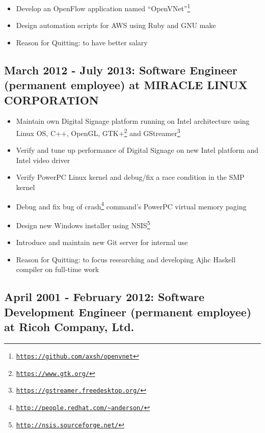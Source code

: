 \documentclass[letterpaper]{article}
\begin{document}
\begin{itemize}
  \item Develop an OpenFlow application named ``OpenVNet''\footnote{\href{https://github.com/axsh/openvnet}{\tt https://github.com/axsh/openvnet}}
  \item Design automation scripts for AWS using Ruby and GNU make
  \item Reason for Quitting: to have better salary
\end{itemize}

\subsection*{March 2012 - July 2013: Software Engineer (permanent employee) at MIRACLE LINUX CORPORATION}

\begin{itemize}
  \item Maintain own Digital Signage platform running on Intel architecture using Linux OS, C++, OpenGL, GTK+\footnote{\href{https://www.gtk.org/}{\tt https://www.gtk.org/}} and GStreamer\footnote{\href{https://gstreamer.freedesktop.org/}{\tt https://gstreamer.freedesktop.org/}}
  \item Verify and tune up performance of Digital Signage on new Intel platform and Intel video driver
  \item Verify PowerPC Linux kernel and debug/fix a race condition in the SMP kernel
  \item Debug and fix bug of crash\footnote{\href{http://people.redhat.com/{\textasciitilde}anderson/}{\tt http://people.redhat.com/{\textasciitilde}anderson/}} command's PowerPC virtual memory paging
  \item Design new Windows installer using NSIS\footnote{\href{http://nsis.sourceforge.net/}{\tt http://nsis.sourceforge.net/}}
  \item Introduce and maintain new Git server for internal use
  \item Reason for Quitting: to focus researching and developing Ajhc Haskell compiler on full-time work
\end{itemize}

\subsection*{April 2001 - February 2012: Software Development Engineer (permanent employee) at Ricoh Company, Ltd.}
\end{document}
